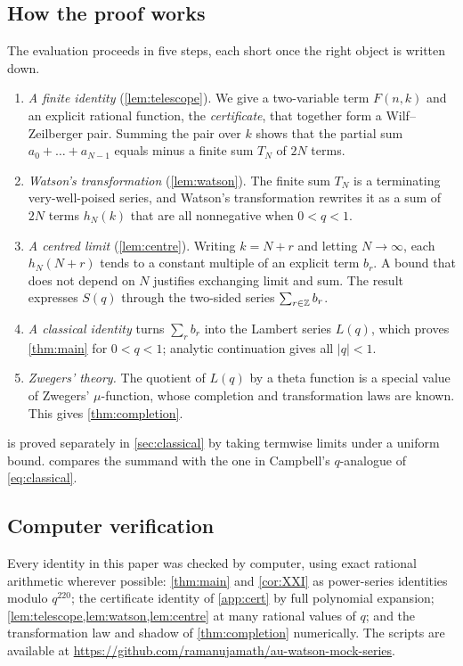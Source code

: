 \subsection{How the proof works}
The evaluation proceeds in five steps, each short once the right object is
written down.
\begin{enumerate}[label=(\arabic*)]
\item \emph{A finite identity} (\cref{lem:telescope}). We give a two-variable
term $F(n,k)$ and an explicit rational function, the \emph{certificate},
that together form a Wilf--Zeilberger pair. Summing the pair over $k$ shows
that the partial sum $a_0+\dots+a_{N-1}$ equals minus a finite sum $T_N$ of
$2N$ terms.
\item \emph{Watson's transformation} (\cref{lem:watson}). The finite sum $T_N$ is a
terminating very-well-poised series, and Watson's transformation rewrites it as
a sum of $2N$ terms $h_N(k)$ that are all nonnegative when $0<q<1$.
\item \emph{A centred limit} (\cref{lem:centre}). Writing $k=N+r$ and letting
$N\to\infty$, each $h_N(N+r)$ tends to a constant multiple of an explicit term
$b_r$. A bound that does not depend on $N$ justifies exchanging limit and sum.
The result expresses $S(q)$ through the two-sided series $\sum_{r\in\mathbb{Z}}b_r$.
\item \emph{A classical identity} turns $\sum_r b_r$ into the Lambert series
$L(q)$, which proves \cref{thm:main} for $0<q<1$; analytic continuation
gives all $|q|<1$.
\item \emph{Zwegers' theory.} The quotient of $L(q)$ by a theta function is a
special value of Zwegers' $\mu$-function, whose completion and transformation
laws are known. This gives \cref{thm:completion}.
\end{enumerate}
 is proved separately in \cref{sec:classical} by taking
termwise limits under a uniform bound.  compares the
summand with the one in Campbell's $q$-analogue of \eqref{eq:classical}.

\subsection{Computer verification}
Every identity in this paper was checked by computer, using exact rational
arithmetic wherever possible: \cref{thm:main} and \cref{cor:XXI} as
power-series identities modulo $q^{220}$; the certificate identity of
\cref{app:cert} by full polynomial expansion; \cref{lem:telescope,lem:watson,lem:centre}
at many rational values of $q$; and the transformation law and shadow of
\cref{thm:completion} numerically. The scripts are available at
\url{https://github.com/ramanujamath/au-watson-mock-series}.
